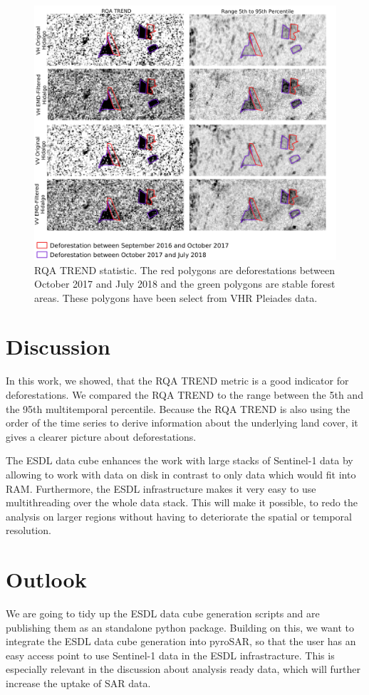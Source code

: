 \documentclass{article}
\begin{document}
\begin{figure}
  \includegraphics[width=\textwidth]{figs/rqa_trend_0317_0319.png}
  \caption{RQA TREND statistic.  The red polygons are deforestations between October 2017 and July 2018 and the green polygons are stable forest areas.
  These polygons have been select from VHR Pleiades data.}
  \label{trend}
\end{figure}


\section{Discussion}

In this work, we showed, that the RQA TREND metric is a good indicator for deforestations.
We compared the RQA TREND to the range between the 5th and the 95th multitemporal percentile. 
Because the RQA TREND is also using the order of the time series to derive information about the underlying land cover,
it gives a clearer picture about deforestations. 



The ESDL data cube enhances the work with large stacks of Sentinel-1 data by allowing to work with data on disk
in contrast to only data which would fit into RAM.
Furthermore, the ESDL infrastructure makes it very easy to use multithreading over the whole data stack. 
This will make it possible, to redo the analysis on larger regions without having to deteriorate the spatial or temporal resolution.


\section{Outlook}
We are going to tidy up the ESDL data cube generation scripts and are publishing them as an standalone python package. 
Building on this, we want to integrate the ESDL data cube generation into pyroSAR, 
so that the user has an easy access point to use Sentinel-1 data in the ESDL infrastracture. 
This is especially relevant in the discussion about analysis ready data, which will further increase the uptake of SAR data. 
\end{document}
